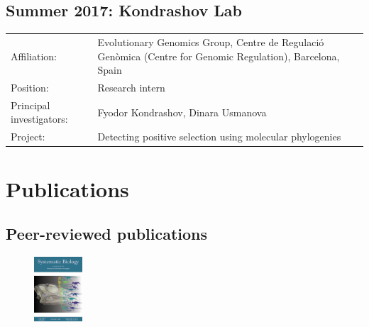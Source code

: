 \documentclass[10pt]{article}
\begin{document}
\subsection*{Summer 2017: Kondrashov Lab}

\begin{tabularx}{\textwidth}{>{\raggedleft\arraybackslash}p{3.6cm} X}
Affiliation: & Evolutionary Genomics Group, Centre de Regulaci\'{o} Gen\`{o}mica (Centre for Genomic Regulation), Barcelona, Spain \\[0.1cm]
Position: & Research intern \\[0.1cm]
Principal investigators: & Fyodor Kondrashov, Dinara Usmanova \\[0.1cm]
Project: & Detecting positive selection using molecular phylogenies \\[0.1cm]
\end{tabularx}

\section*{Publications}

\subsection*{Peer-reviewed publications}

\begin{figure}
 \begin{center}
   \includegraphics[width=0.16\textwidth]{SysBioCover.png}
 \end{center}
\end{figure}
\end{document}
